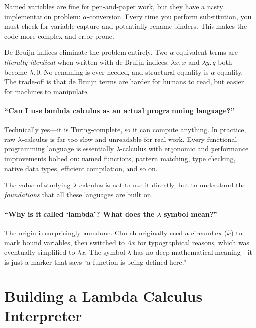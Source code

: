 \documentclass[11pt,a4paper]{article}
\theoremstyle{definition}
\newcommand{\lam}{\lambda}
\begin{document}
Named variables are fine for pen-and-paper work, but they have a nasty
implementation problem: $\alpha$-conversion. Every time you perform
substitution, you must check for variable capture and potentially rename
binders. This makes the code more complex and error-prone.

De Bruijn indices eliminate the problem entirely. Two $\alpha$-equivalent
terms are \emph{literally identical} when written with de Bruijn indices:
$\lam x.\, x$ and $\lam y.\, y$ both become $\lam.\, 0$. No renaming is ever
needed, and structural equality is $\alpha$-equality. The trade-off is that
de Bruijn terms are harder for humans to read, but easier for machines to
manipulate.

\subsection{``Can I use lambda calculus as an actual programming language?''}

Technically yes---it is Turing-complete, so it can compute anything. In
practice, raw $\lam$-calculus is far too slow and unreadable for real work.
Every functional programming language is essentially $\lam$-calculus with
ergonomic and performance improvements bolted on: named functions, pattern
matching, type checking, native data types, efficient compilation, and so on.

The value of studying $\lam$-calculus is not to use it directly, but to
understand the \emph{foundations} that all these languages are built on.

\subsection{``Why is it called `lambda'? What does the $\lam$ symbol mean?''}

The origin is surprisingly mundane. Church originally used a circumflex
($\hat{x}$) to mark bound variables, then switched to $\Lambda x$ for
typographical reasons, which was eventually simplified to $\lam x$. The symbol
$\lam$ has no deep mathematical meaning---it is just a marker that says
``a function is being defined here.''

\part{Building a Lambda Calculus Interpreter}
\end{document}
